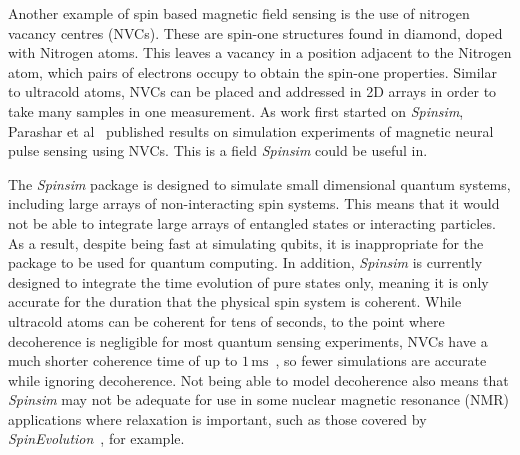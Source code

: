 \documentclass{jors}
\begin{document}
		Another example of spin based magnetic field sensing is the use of nitrogen vacancy centres (NVCs).
		These are spin-one structures found in diamond, doped with Nitrogen atoms.
		This leaves a vacancy in a position adjacent to the Nitrogen atom, which pairs of electrons occupy to obtain the spin-one properties.
		Similar to ultracold atoms, NVCs can be placed and addressed in 2D arrays in order to take many samples in one measurement.
		As work first started on \emph{Spinsim}, Parashar et al~\cite{parashar_axon_2020} published results on simulation experiments of magnetic neural pulse sensing using NVCs.
		This is a field \emph{Spinsim} could be useful in.

		The \emph{Spinsim} package is designed to simulate small dimensional quantum systems, including large arrays of non-interacting spin systems.
		This means that it would not be able to integrate large arrays of entangled states or interacting particles.
		As a result, despite being fast at simulating qubits, it is inappropriate for the package to be used for quantum computing.
		In addition, \emph{Spinsim} is currently designed to integrate the time evolution of pure states only, meaning it is only accurate for the duration that the physical spin system is coherent.
		While ultracold atoms can be coherent for tens of seconds, to the point where decoherence is negligible for most quantum sensing experiments, NVCs have a much shorter coherence time of up to $ 1\,\text{ms} $~\cite{degen_quantum_2017}, so fewer simulations are accurate while ignoring decoherence.
		Not being able to model decoherence also means that \emph{Spinsim} may not be adequate for use in some nuclear magnetic resonance (NMR) applications where relaxation is important, such as those covered by \emph{SpinEvolution}~\cite{veshtort_spinevolution_2006}, for example.
\end{document}
